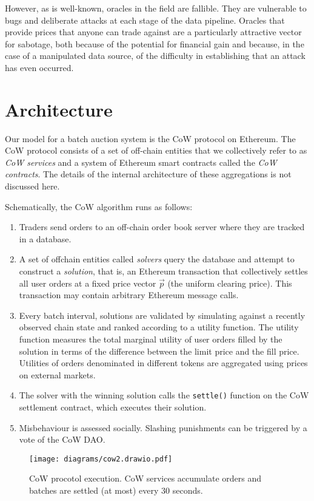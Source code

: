 \documentclass[a4paper,10pt]{article}
\begin{document}
However, as is well-known, oracles in the field are fallible.
%
They are vulnerable to bugs and deliberate attacks at each stage of the data pipeline.
%
Oracles that provide prices that anyone can trade against are a particularly attractive vector for sabotage, both because of the potential for financial gain and because, in the case of a manipulated data source, of the difficulty in establishing that an attack has even occurred. 

\section{Architecture}

Our model for a batch auction system is the CoW protocol on Ethereum.
%
The CoW protocol consists of a set of off-chain entities that we collectively refer to as \emph{CoW services} and a system of Ethereum smart contracts called the \emph{CoW contracts}. The details of the internal architecture of these aggregations is not discussed here.

Schematically, the CoW algorithm runs as follows:
\begin{enumerate}
  \item 
    Traders send orders to an off-chain order book server where they are tracked in a database.
    
  \item 
    A set of offchain entities called \emph{solvers} query the database and attempt to construct a \emph{solution}, that is, an Ethereum transaction that collectively settles all user orders at a fixed price vector $\vec{p}$ (the uniform clearing price).
    This transaction may contain arbitrary Ethereum message calls.
    
  \item
    Every batch interval, solutions are validated by simulating against a recently observed chain state and ranked according to a utility function.
    The utility function measures the total marginal utility of user orders filled by the solution in terms of the difference between the limit price and the fill price.
    Utilities of orders denominated in different tokens are aggregated using prices on external markets.
    
  \item
    The solver with the winning solution calls the \texttt{settle()} function on the CoW settlement contract, which executes their solution.
    
  \item
    Misbehaviour is assessed socially. Slashing punishments can be triggered by a vote of the CoW DAO.
\end{enumerate}
\begin{figure}
  \begin{center}
    \texttt{[image: diagrams/cow2.drawio.pdf]}
    \caption{CoW procotol execution. CoW services accumulate orders and batches are settled (at most) every 30 seconds.}
  \end{center}
\end{figure}
\end{document}

